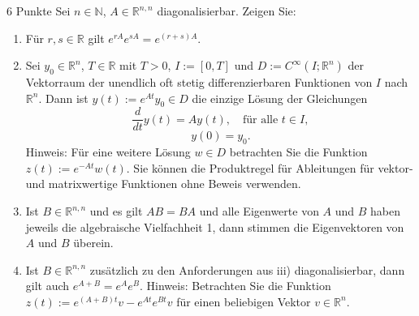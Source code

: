 \documentclass{problemset}
\author{Michael van Straten}
\begin{document}
\maketitle

\begin{problem}{6 Punkte}
Sei $n \in \mathbb{N}$, $A \in \mathbb{R}^{n,n}$ diagonalisierbar. Zeigen Sie:
\begin{enumerate}
    \item Für $r, s \in \mathbb{R}$ gilt $e^{rA}e^{sA} = e^{(r+s)A}$.
    \item Sei $y_0 \in \mathbb{R}^n$, $T \in \mathbb{R}$ mit $T > 0$, $I := [0,
          T]$ und $D := C^\infty(I; \mathbb{R}^n)$ der Vektorraum der unendlich
          oft stetig differenzierbaren Funktionen von $I$ nach $\mathbb{R}^n$.
          Dann ist $y(t) := e^{At}y_0 \in D$ die einzige Lösung der Gleichungen
          \[ \frac{d}{dt} y(t) = Ay(t), \quad \text{für alle } t \in I, \]
          \[ y(0) = y_0. \]
          Hinweis: Für eine weitere Lösung $w \in D$ betrachten Sie die
          Funktion $z(t) := e^{-At}w(t)$. Sie können die Produktregel für
          Ableitungen für vektor- und matrixwertige Funktionen ohne Beweis
          verwenden.
    \item Ist $B \in \mathbb{R}^{n,n}$ und es gilt $AB = BA$ und alle
          Eigenwerte von $A$ und $B$ haben jeweils die algebraische
          Vielfachheit 1, dann stimmen die Eigenvektoren von $A$ und $B$
          überein.
    \item Ist $B \in \mathbb{R}^{n,n}$ zusätzlich zu den Anforderungen aus iii)
          diagonalisierbar, dann gilt auch $e^{A+B} = e^Ae^B$. Hinweis:
          Betrachten Sie die Funktion $z(t) := e^{(A+B)t}v - e^{At}e^{Bt}v$ für
          einen beliebigen Vektor $v \in \mathbb{R}^n$.
\end{enumerate}
\end{problem}
\end{document}
